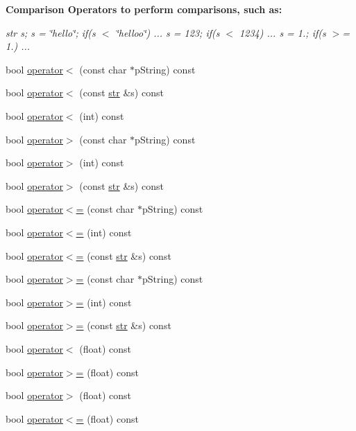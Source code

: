 \begin{Indent}{\bf Comparison Operators to perform comparisons, such as\+:}\par
{\em str s; s = \char`\"{}hello\char`\"{}; if(s $<$ \char`\"{}helloo\char`\"{}) ... s = 123; if(s $<$ 1234) ... s = 1.; if(s $>$= 1.) ... }\begin{DoxyCompactItemize}
\item 
bool \hyperlink{classstr_a818b0b6acb3bb13a14378b1aef3868ae}{operator$<$} (const char $\ast$p\+String) const 
\item 
bool \hyperlink{classstr_a59eee4785b6107a5f48c44c0d335d66c}{operator$<$} (const \hyperlink{classstr}{str} \&s) const 
\item 
bool \hyperlink{classstr_ae13ff261c8a9329cc14581b836ca83ce}{operator$<$} (int) const 
\item 
bool \hyperlink{classstr_aba022527319f3c6d9959c98d3720fb2c}{operator$>$} (const char $\ast$p\+String) const 
\item 
bool \hyperlink{classstr_aec4331bed074d43dec1b6919c984155b}{operator$>$} (int) const 
\item 
bool \hyperlink{classstr_a4391d0576500d58c0e51da8c32032dd3}{operator$>$} (const \hyperlink{classstr}{str} \&s) const 
\item 
bool \hyperlink{classstr_ab8384404397fbb8722f16c11148863de}{operator$<$=} (const char $\ast$p\+String) const 
\item 
bool \hyperlink{classstr_a56ddeebb2ed5a599faec2db2a24e7102}{operator$<$=} (int) const 
\item 
bool \hyperlink{classstr_ab7e30179f4595313e2ae47e31eb8cbbd}{operator$<$=} (const \hyperlink{classstr}{str} \&s) const 
\item 
bool \hyperlink{classstr_a7c3d3edc8b2736e953097e1123701d6d}{operator$>$=} (const char $\ast$p\+String) const 
\item 
bool \hyperlink{classstr_a9589750a5e668b2f9f040babcf440258}{operator$>$=} (int) const 
\item 
bool \hyperlink{classstr_ae1f2587698481cf2d7af8c8f9acbacfa}{operator$>$=} (const \hyperlink{classstr}{str} \&s) const 
\item 
bool \hyperlink{classstr_a97c96ebd9b5a44b7e776c49a71b9c502}{operator$<$} (float) const 
\item 
bool \hyperlink{classstr_a6475d932689a67b53db32b31146bf8bb}{operator$>$=} (float) const 
\item 
bool \hyperlink{classstr_a901950cdc3241ce8f9d389c52fda3c9d}{operator$>$} (float) const 
\item 
bool \hyperlink{classstr_aa09eb34e781c73d2e8a3be10bb377f75}{operator$<$=} (float) const 
\end{DoxyCompactItemize}
\end{Indent}
